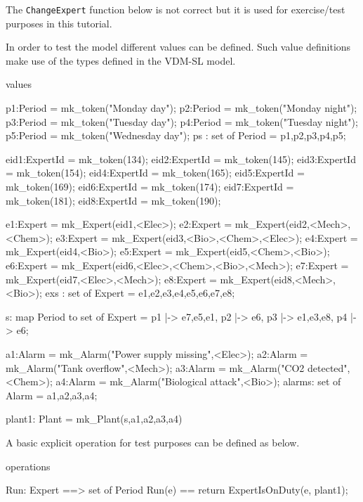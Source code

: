 The \texttt{ChangeExpert} function below is not correct but it is used
for exercise/test purposes in this tutorial.

\begin{vdmsl}
functions

ChangeExpert: Plant * Expert * Expert * Period -> Plant
ChangeExpert(mk_Plant(plan,alarms),ex1,ex2,peri) ==
  mk_Plant(plan ++ {peri |-> plan(peri)\{ex1} union {ex2}},
           alarms)
\end{vdmsl}

In order to test the model different values can be defined. Such value
definitions make use of the types defined in the VDM-SL model.


\begin{vdmsl}
values
 
  p1:Period = mk_token("Monday day");
  p2:Period = mk_token("Monday night");
  p3:Period = mk_token("Tuesday day");
  p4:Period = mk_token("Tuesday night");
  p5:Period = mk_token("Wednesday day");
  ps : set of Period = {p1,p2,p3,p4,p5};

  eid1:ExpertId = mk_token(134);
  eid2:ExpertId = mk_token(145);
  eid3:ExpertId = mk_token(154);
  eid4:ExpertId = mk_token(165);
  eid5:ExpertId = mk_token(169);
  eid6:ExpertId = mk_token(174);
  eid7:ExpertId = mk_token(181);
  eid8:ExpertId = mk_token(190);
  
  e1:Expert = mk_Expert(eid1,{<Elec>});
  e2:Expert = mk_Expert(eid2,{<Mech>,<Chem>});
  e3:Expert = mk_Expert(eid3,{<Bio>,<Chem>,<Elec>});
  e4:Expert = mk_Expert(eid4,{<Bio>});
  e5:Expert = mk_Expert(eid5,{<Chem>,<Bio>});
  e6:Expert = mk_Expert(eid6,{<Elec>,<Chem>,<Bio>,<Mech>});
  e7:Expert = mk_Expert(eid7,{<Elec>,<Mech>});
  e8:Expert = mk_Expert(eid8,{<Mech>,<Bio>});
  exs : set of Expert = {e1,e2,e3,e4,e5,e6,e7,e8};

  s: map Period to set of Expert
     = {p1 |-> {e7,e5,e1},
        p2 |-> {e6},
        p3 |-> {e1,e3,e8},
        p4 |-> {e6}};

  a1:Alarm = mk_Alarm("Power supply missing",<Elec>);
  a2:Alarm = mk_Alarm("Tank overflow",<Mech>);
  a3:Alarm = mk_Alarm("CO2 detected",<Chem>);
  a4:Alarm = mk_Alarm("Biological attack",<Bio>);
  alarms: set of Alarm = {a1,a2,a3,a4};

  plant1: Plant = mk_Plant(s,{a1,a2,a3,a4})
\end{vdmsl}  

A basic explicit operation for test purposes can be defined as below.

\begin{vdmsl}  
operations

Run: Expert ==> set of Period
Run(e) == return ExpertIsOnDuty(e, plant1);
\end{vdmsl}

